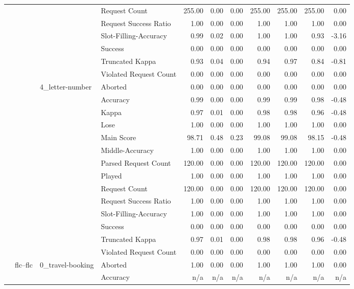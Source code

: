 \begin{tabular}{llllrrrrrrr}
 &  &  & Request Count & 255.00 & 0.00 & 0.00 & 255.00 & 255.00 & 255.00 & 0.00 \\
 &  &  & Request Success Ratio & 1.00 & 0.00 & 0.00 & 1.00 & 1.00 & 1.00 & 0.00 \\
 &  &  & Slot-Filling-Accuracy & 0.99 & 0.02 & 0.00 & 1.00 & 1.00 & 0.93 & -3.16 \\
 &  &  & Success & 0.00 & 0.00 & 0.00 & 0.00 & 0.00 & 0.00 & 0.00 \\
 &  &  & Truncated Kappa & 0.93 & 0.04 & 0.00 & 0.94 & 0.97 & 0.84 & -0.81 \\
 &  &  & Violated Request Count & 0.00 & 0.00 & 0.00 & 0.00 & 0.00 & 0.00 & 0.00 \\
\cline{3-11}
 &  & \multirow[t]{14}{*}{4_letter-number} & Aborted & 0.00 & 0.00 & 0.00 & 0.00 & 0.00 & 0.00 & 0.00 \\
 &  &  & Accuracy & 0.99 & 0.00 & 0.00 & 0.99 & 0.99 & 0.98 & -0.48 \\
 &  &  & Kappa & 0.97 & 0.01 & 0.00 & 0.98 & 0.98 & 0.96 & -0.48 \\
 &  &  & Lose & 1.00 & 0.00 & 0.00 & 1.00 & 1.00 & 1.00 & 0.00 \\
 &  &  & Main Score & 98.71 & 0.48 & 0.23 & 99.08 & 99.08 & 98.15 & -0.48 \\
 &  &  & Middle-Accuracy & 1.00 & 0.00 & 0.00 & 1.00 & 1.00 & 1.00 & 0.00 \\
 &  &  & Parsed Request Count & 120.00 & 0.00 & 0.00 & 120.00 & 120.00 & 120.00 & 0.00 \\
 &  &  & Played & 1.00 & 0.00 & 0.00 & 1.00 & 1.00 & 1.00 & 0.00 \\
 &  &  & Request Count & 120.00 & 0.00 & 0.00 & 120.00 & 120.00 & 120.00 & 0.00 \\
 &  &  & Request Success Ratio & 1.00 & 0.00 & 0.00 & 1.00 & 1.00 & 1.00 & 0.00 \\
 &  &  & Slot-Filling-Accuracy & 1.00 & 0.00 & 0.00 & 1.00 & 1.00 & 1.00 & 0.00 \\
 &  &  & Success & 0.00 & 0.00 & 0.00 & 0.00 & 0.00 & 0.00 & 0.00 \\
 &  &  & Truncated Kappa & 0.97 & 0.01 & 0.00 & 0.98 & 0.98 & 0.96 & -0.48 \\
 &  &  & Violated Request Count & 0.00 & 0.00 & 0.00 & 0.00 & 0.00 & 0.00 & 0.00 \\
\cline{2-11} \cline{3-11}
 & \multirow[t]{65}{*}{flc--flc} & \multirow[t]{13}{*}{0_travel-booking} & Aborted & 1.00 & 0.00 & 0.00 & 1.00 & 1.00 & 1.00 & 0.00 \\
 &  &  & Accuracy & n/a & n/a & n/a & n/a & n/a & n/a & n/a \\

\end{tabular}
